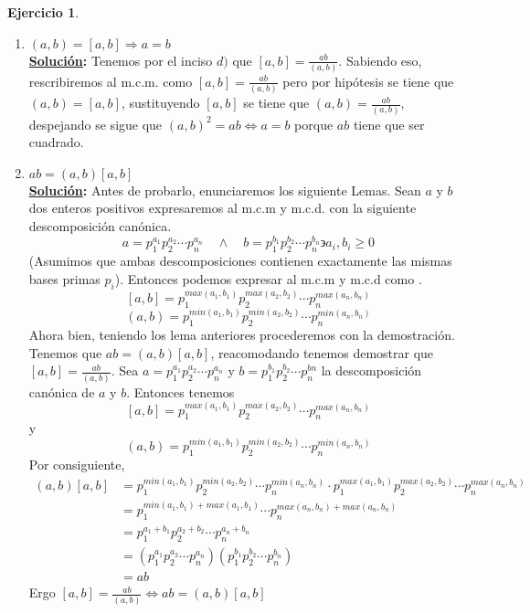 \documentclass[11pt,letterpaper]{article}
\theoremstyle{definition}\newtheorem{p}{Ejercicio}
\theoremstyle{definition}\newtheorem{pp}[p]{$(*)$Ejercicio}
\numberwithin{p}{section}
\newcommand{\ent}{\Longrightarrow}
\newcommand{\sol}{\textbf{\underline{Solución}: }} %
\begin{document}
\begin{p}
\begin{enumerate}
  \item $(a,b)=[a,b] \ent a=b$\\
  \sol Tenemos por el inciso $d)$ que $[a,b]=\frac{ab}{(a,b)}$. Sabiendo eso, rescribiremos al m.c.m. como 
  $[a,b] = \frac{ab}{(a,b)}$ pero por hipótesis se tiene que $(a,b)=[a,b]$, sustituyendo $[a,b]$ se tiene que 
  $(a,b) = \frac{ab}{(a,b)}$, despejando se sigue que $(a,b)^2 = ab \iff a=b$ porque $ab$ tiene que 
  ser cuadrado.
  
  \item $ab=(a,b)[a,b]$\\
  \sol Antes de probarlo, enunciaremos los siguiente Lemas. Sean $a$ y $b$ dos enteros positivos  
  expresaremos al m.c.m y m.c.d. con la siguiente descomposición canónica.
  $$a=p_{1}^{a_1}p_{2}^{a_2} \cdots p_{n}^{a_n} \quad \land  \quad b=p_{1}^{b_1}p_{2}^{b_2} \cdots p_{n}^{b_n} \backepsilon a_i,b_i \geq 0$$
  (Asumimos que ambas descomposiciones contienen exactamente las mismas bases primas $p_i$). 
  Entonces podemos expresar al m.c.m y m.c.d como .
  $$[a,b] =p_{1}^{max(a_1,b_1)}p_{2}^{max(a_2,b_2)} \cdots p_{n}^{max(a_n,b_n)}$$
  $$(a,b) =p_{1}^{min(a_1,b_1)}p_{2}^{min(a_2,b_2)} \cdots p_{n}^{min(a_n,b_n)}$$
  Ahora bien, teniendo los lema anteriores procederemos con la demostración.\\
  Tenemos que $ab=(a,b)[a,b]$, reacomodando tenemos demostrar que $[a,b]=\frac{ab}{(a,b)}$.
  Sea $a=p_{1}^{a_1}p_{2}^{a_2} \cdots p_{n}^{a_n}$ y $b=p_{1}^{b_1}p_{2}^{b_2} \cdots p_{n}^{bn}$ 
  la descomposición canónica de $a$ y $b$. Entonces tenemos
  $$[a,b] = p_{1}^{max(a_1,b_1)}p_{2}^{max(a_2,b_2)} \cdots p_{n}^{max(a_n,b_n)}$$
  y
  $$(a,b) = p_{1}^{min(a_1,b_1)}p_{2}^{min(a_2,b_2)} \cdots p_{n}^{min(a_n,b_n)}$$
  Por consiguiente,
  \begin{align*}
  (a,b)[a,b]
    &= p_{1}^{min(a_1,b_1)}p_{2}^{min(a_2,b_2)} \cdots p_{n}^{min(a_n,b_n)} \cdot p_{1}^{max(a_1,b_1)}p_{2}^{max(a_2,b_2)} \cdots p_{n}^{max(a_n,b_n)} \\
    &= p_{1}^{min(a_1,b_1)+max(a_1,b_1)} \cdots p_{n}^{max(a_n,b_n)+max(a_n,b_n)} \\
    &= p_{1}^{a_1 + b_1}p_{2}^{a_2 + b_2} \cdots p_{n}^{a_n + b_n} \\
    &= (p_{1}^{a_1}p_{2}^{a_2} \cdots p_{n}^{a_n})(p_{1}^{b_1}p_{2}^{b_2} \cdots p_{n}^{b_n}) \\
    &= ab
  \end{align*}
  Ergo $[a,b]=\frac{ab}{(a,b)}  \iff ab=(a,b)[a,b]$  
  

\end{enumerate}
\end{p}
\end{document}
